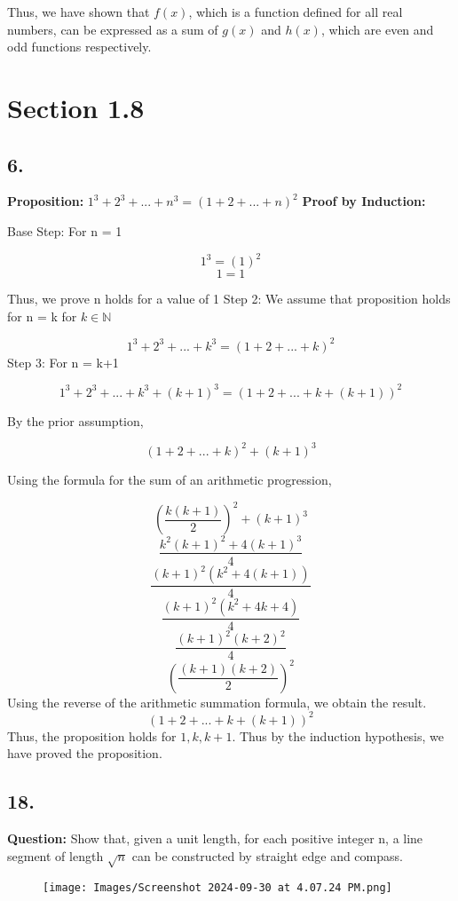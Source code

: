 \documentclass[12pt, a4paper]{article}
\begin{document}
Thus, we have shown that $f(x)$, which is a function defined for all real numbers, can be expressed as a sum of $g(x)$ and $h(x)$, which are even and odd functions respectively.
\newpage
\section*{Section 1.8}\bigbreak
\subsection*{6.}\bigbreak
\textbf{Proposition:} $1^3 + 2^3 + ... + n^3 = (1+2+...+n)^2$\bigbreak
\noindent\textbf{Proof by Induction:}\bigbreak

\noindent Base Step:
\bigbreak
For n = 1

\[
1^3 = (1)^2
\]
\[
1 = 1
\]

Thus, we prove n holds for a value of 1
\bigbreak
\noindent Step 2:
\bigbreak
We assume that proposition holds for n = k for $k \in \mathbb{N}$

\[
1^3 + 2^3 + ... + k^3 = (1+2+...+k)^2
\]
\bigbreak
\noindent Step 3:
\bigbreak
For n = k+1

\[
1^3 + 2^3 + ... + k^3 + (k+1)^3 = (1+2+...+k +(k+1))^2
\]

By the prior assumption,

\[
    (1+2+...+k)^2 + (k+1)^3
\]

Using the formula for the sum of an arithmetic progression,

\[
\left(\frac{k(k+1)}{2}\right)^2 + (k+1)^3
\]
\[
\frac{k^2(k+1)^2 + 4(k+1)^3}{4} 
\]
\[
\frac{(k+1)^2(k^2 + 4(k+1))}{4}
\]
\[
\frac{(k+1)^2(k^2 + 4k + 4)}{4}
\]
\[
\frac{(k+1)^2(k+2)^2}{4}
\]
\[
\left( \frac{(k+1)(k+2)}{2}\right)^2
\]
Using the reverse of the arithmetic summation formula, we obtain the result.
\[
(1+2+...+k+(k+1))^2
\]
Thus, the proposition holds for $1, k, k+1$. Thus by the induction hypothesis, we have proved the proposition.
\bigbreak

\subsection*{18.}

\textbf{Question:} Show that, given a unit length, for each positive integer n, a line segment of length $\sqrt{n}$ can be constructed by straight edge and compass.

\begin{figure}[h!]
    \centering
    \texttt{[image: Images/Screenshot 2024-09-30 at 4.07.24 PM.png]}
\end{figure}
\end{document}
